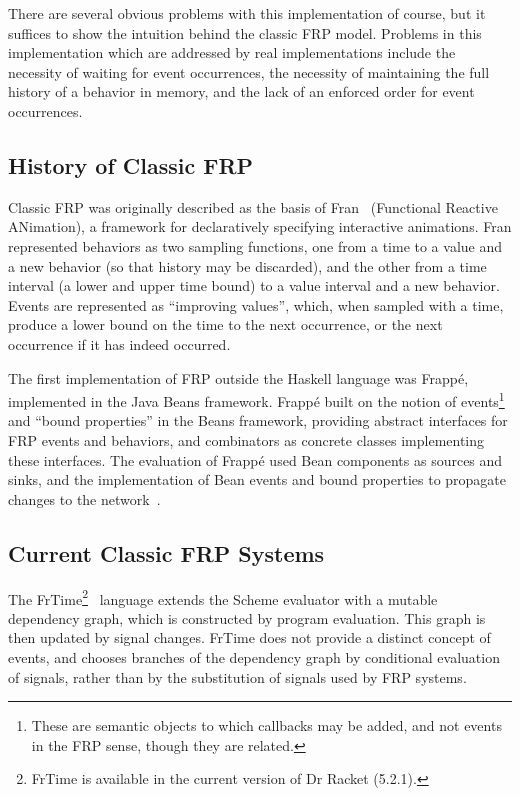 There are several obvious problems with this implementation of course, but it
suffices to show the intuition behind the classic FRP model. Problems in this
implementation which are addressed by real implementations include the necessity
of waiting for event occurrences, the necessity of maintaining the full history
of a behavior in memory, and the lack of an enforced order for event
occurrences.

\subsection{History of Classic FRP}
\label{subsection:Background-Classic_FRP-History_of_Classic_FRP}
Classic FRP was originally described as the basis of Fran~\cite{Elliott1997}
(Functional Reactive ANimation), a framework for declaratively specifying
interactive animations. Fran represented behaviors as two sampling functions,
one from a time to a value and a new behavior (so that history may be discarded),
and the other from a time interval (a lower and upper time bound) to a value
interval and a new behavior. Events are represented as ``improving values'',
which, when sampled with a time, produce a lower bound on the time to the next
occurrence, or the next occurrence if it has indeed occurred.

The first implementation of FRP outside the Haskell language was Frapp\'{e}, 
implemented in the Java Beans framework. Frapp\'{e} built on the notion
of events\footnote{These are semantic objects to which callbacks may be added,
and not events in the FRP sense, though they are related.} and ``bound
properties'' in the Beans framework, providing abstract interfaces for FRP
events and behaviors, and combinators as concrete classes implementing these
interfaces. The evaluation of Frapp\'{e} used Bean components as sources and
sinks, and the implementation of Bean events and bound properties to propagate
changes to the network~\cite{Courtney2001-2}. 

\subsection{Current Classic FRP Systems}
\label{subsection:Background-Classic_FRP-Current_Classic_FRP_Systems}

The FrTime\footnote{FrTime is available in the current version of Dr Racket (5.2.1).}~\cite{Cooper2006}
language extends the Scheme evaluator with a mutable dependency graph, which is
constructed by program evaluation. This graph is then updated by signal changes.
FrTime does not provide a distinct concept of events, and chooses branches of
the dependency graph by conditional evaluation of signals, rather than by the
substitution of signals used by FRP systems.

